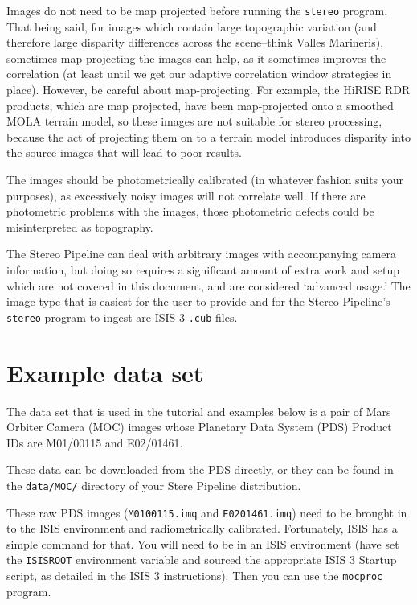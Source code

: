 Images do not need to be map projected before running the \texttt{stereo}
program. That being said, for images which contain large topographic
variation (and therefore large disparity differences across the
scene--think Valles Marineris), sometimes map-projecting the images
can help, as it sometimes improves the correlation (at least until
we get our adaptive correlation window strategies in place).  However,
be careful about map-projecting.  For example, the HiRISE RDR
products, which are map projected, have been map-projected onto a
smoothed MOLA terrain model, so these images are not suitable for
stereo processing, because the act of projecting them on to a terrain
model introduces disparity into the source images that will lead
to poor results.

The images should be photometrically calibrated (in whatever fashion
suits your purposes), as excessively noisy images will not correlate
well.  If there are photometric problems with the images, those
photometric defects could be misinterpreted as topography.

The Stereo Pipeline can deal with arbitrary images with accompanying
camera information, but doing so requires a significant amount of
extra work and setup which are not covered in this document, and
are considered `advanced usage.'  The image type that is easiest
for the user to provide and for the Stereo Pipeline's \texttt{stereo}
program to ingest are ISIS 3 \texttt{.cub} files.


\section{Example data set}

The data set that is used in the tutorial and examples below is a
pair of Mars Orbiter Camera (MOC)
\citep{1992JGR....97.7699M,2001JGR...10623429M} images whose Planetary
Data System (PDS) Product IDs are M01/00115 and E02/01461.

These data can be downloaded from the PDS directly, or they can be found in 
the \texttt{data/MOC/} directory of your Stere Pipeline distribution.

These raw PDS images (\texttt{M0100115.imq} and \texttt{E0201461.imq})
need to be brought in to the ISIS environment and radiometrically
calibrated.  Fortunately, ISIS has a simple command for that.  You
will need to be in an ISIS environment (have set the \texttt{ISISROOT}
environment variable and sourced the appropriate ISIS 3 Startup
script, as detailed in the ISIS 3 instructions).  Then you can use the
\texttt{mocproc} program.

